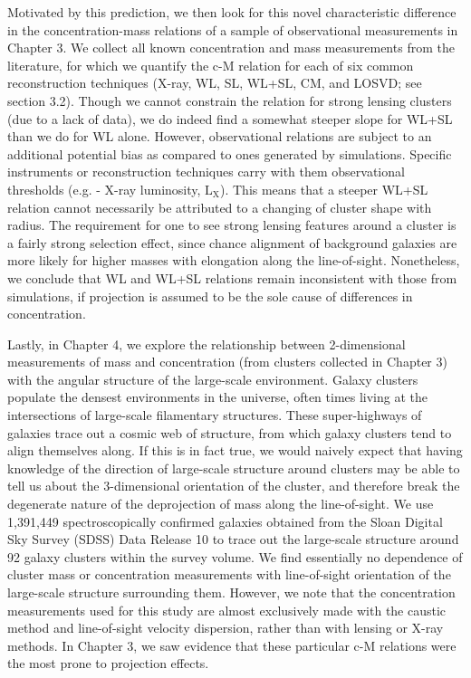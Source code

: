 Motivated by this prediction, we then look for this novel characteristic difference in the
concentration-mass relations of a sample of observational measurements in
Chapter 3. We collect all known concentration and mass measurements from the
literature, for which we quantify the c-M relation for each of six common
reconstruction techniques (X-ray, WL, SL, WL+SL, CM, and LOSVD; see section
3.2). Though we cannot constrain the relation for strong lensing clusters (due
to a lack of data), we do indeed find a somewhat steeper slope for WL+SL than
we do for WL alone. However, observational relations are subject to an
additional potential bias as compared to ones generated by
simulations. Specific instruments or reconstruction techniques carry with them
observational thresholds (e.g. - X-ray luminosity, $\mathrm{L_{X}}$). This means that 
a steeper WL+SL relation cannot necessarily be attributed to a changing of
cluster shape with radius. The requirement for one to see strong lensing features
around a cluster is a fairly strong selection effect, since chance alignment of
background galaxies are more likely for higher masses with elongation along the
line-of-sight. Nonetheless, we conclude that WL and WL+SL relations remain
inconsistent with those from simulations, if projection is assumed to be the
sole cause of differences in concentration. 

Lastly, in Chapter 4, we explore the relationship between 2-dimensional
measurements of mass and concentration (from clusters collected in Chapter 3)
with the angular structure of the large-scale environment. Galaxy clusters
populate the densest environments in the universe, often times living at the
intersections of large-scale filamentary structures. These super-highways of galaxies
trace out a cosmic web of structure, from which galaxy clusters tend to align
themselves along. If this is in fact true, we would naively expect that having knowledge of
the direction of large-scale structure around clusters may be able to tell us
about the 3-dimensional orientation of the cluster, and therefore break the
degenerate nature of the deprojection of mass along the line-of-sight. We use
1,391,449 spectroscopically confirmed galaxies obtained from the Sloan
Digital Sky Survey (SDSS) Data Release 10 to trace out the large-scale
structure around 92 galaxy clusters within the survey volume. We find
essentially no dependence of cluster mass or concentration measurements with
line-of-sight orientation of the large-scale structure surrounding
them. However, we note that the concentration measurements used for this study
are almost exclusively made with the caustic method and line-of-sight velocity
dispersion, rather than with lensing or X-ray methods. In Chapter 3, we saw evidence
that these particular c-M relations were the most prone to projection
effects. 

